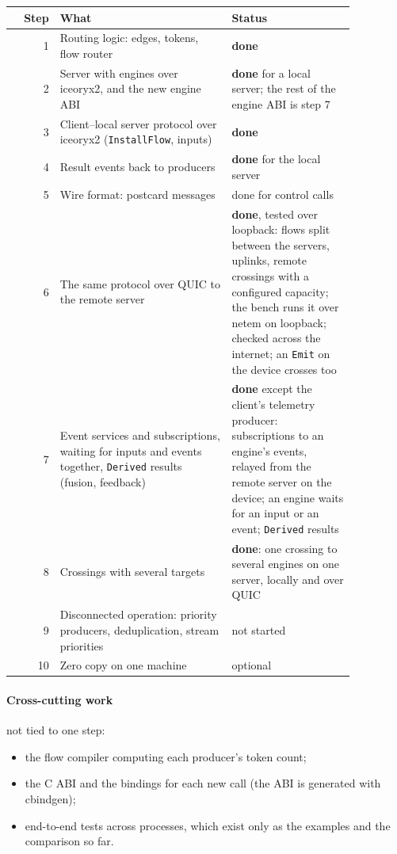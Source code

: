 \documentclass[11pt]{article}
\newcommand{\code}[1]{\texttt{#1}}
\begin{document}
\begin{center}
\small
\begin{tabular}{@{}rp{0.5\linewidth}p{0.36\linewidth}@{}}
\toprule
Step & What & Status \\
\midrule
1  & Routing logic: edges, tokens, flow router
   & \textbf{done} \\
2  & Server with engines over iceoryx2, and the new engine ABI
   & \textbf{done} for a local server; the rest of the engine ABI is
     step 7 \\
3  & Client--local server protocol over iceoryx2 (\code{InstallFlow}, inputs)
   & \textbf{done} \\
4  & Result events back to producers
   & \textbf{done} for the local server \\
5  & Wire format: postcard messages
   & done for control calls \\
6  & The same protocol over QUIC to the remote server
   & \textbf{done}, tested over loopback: flows split between the servers,
     uplinks, remote crossings with a configured capacity; the bench runs
     it over netem on loopback; checked across the internet; an \code{Emit}
     on the device crosses too \\
7  & Event services and subscriptions, waiting for inputs and events
     together, \code{Derived} results (fusion, feedback)
   & \textbf{done} except the client's telemetry producer: subscriptions to an
     engine's events, relayed from the remote server on the device; an engine
     waits for an input or an event; \code{Derived} results \\
8  & Crossings with several targets
   & \textbf{done}: one crossing to several engines on one server, locally
     and over QUIC \\
9  & Disconnected operation: priority producers, deduplication, stream
     priorities
   & not started \\
10 & Zero copy on one machine
   & optional \\
\bottomrule
\end{tabular}
\end{center}

\paragraph{Cross-cutting work} not tied to one step:
\begin{itemize}[nosep]
  \item the flow compiler computing each producer's token count;
  \item the C ABI and the bindings for each new call (the ABI is generated
        with cbindgen);
  \item end-to-end tests across processes, which exist only as the examples
        and the comparison so far.
\end{itemize}
\end{document}
